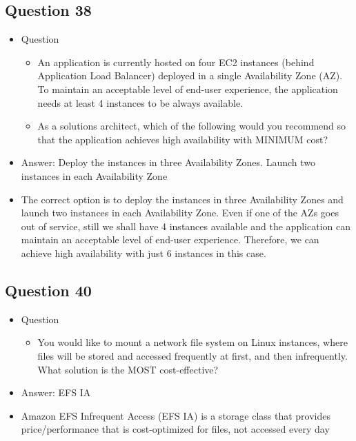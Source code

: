 \documentclass[]{scrartcl}
\begin{document}
\subsection{Question 38}
\begin{itemize}
	\item Question
	\begin{itemize}
		\item An application is currently hosted on four EC2 instances (behind Application Load Balancer) deployed in a single Availability Zone (AZ). To maintain an acceptable level of end-user experience, the application needs at least 4 instances to be always available.
		\item As a solutions architect, which of the following would you recommend so that the application achieves high availability with MINIMUM cost?
	\end{itemize}
	\item Answer: Deploy the instances in three Availability Zones. Launch two instances in each Availability Zone
	\item The correct option is to deploy the instances in three Availability Zones and launch two instances in each Availability Zone. Even if one of the AZs goes out of service, still we shall have 4 instances available and the application can maintain an acceptable level of end-user experience. Therefore, we can achieve high availability with just 6 instances in this case.
\end{itemize}

\subsection{Question 40}
\begin{itemize}
	\item Question
	\begin{itemize}
		\item You would like to mount a network file system on Linux instances, where files will be stored and accessed frequently at first, and then infrequently. What solution is the MOST cost-effective?
	\end{itemize}
	\item Answer: EFS IA
	\item Amazon EFS Infrequent Access (EFS IA) is a storage class that provides price/performance that is cost-optimized for files, not accessed every day
\end{itemize}
\end{document}
